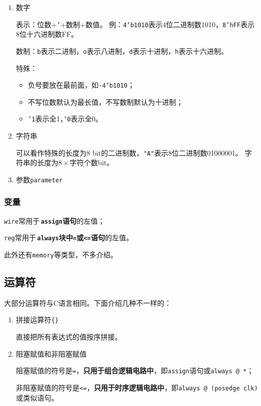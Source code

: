 \documentclass[UTF8,fontset=fandol,zihao=5]{ctexart}
\let\tt\texttt
\begin{document}
\begin{enumerate}
  \item 数字
  
  表示：位数+\tt{'}+数制+数值。
  例：\tt{4'b1010}表示4位二进制数1010，\tt{8'hFF}表示8位十六进制数FF。

  数制：\tt{b}表示二进制，\tt{o}表示八进制，\tt{d}表示十进制，\tt{h}表示十六进制。

  特殊：
  \begin{itemize}
    \item 负号要放在最前面，如\tt{-4'b1010}；
    \item 不写位数默认为最长值，不写数制默认为十进制；
    \item \tt{'1}表示全1，\tt{'0}表示全0。
  \end{itemize}
  
  \item 字符串
  
  可以看作特殊的长度为8 bit的二进制数，\tt{"A"}表示8位二进制数01000001。
  字符串的长度为$8\times\text{字符个数}$bit。

  \item 参数\tt{parameter}
\end{enumerate}

\subsubsection{变量}

  \tt{wire}常用于\,\textbf{\tt{assign}语句}的左值；
  
  \tt{reg}常用于\,\textbf{\tt{always}块中\tt{=}或\tt{<=}语句}的左值。

  此外还有\tt{memory}等类型，不多介绍。

\subsection{运算符}

大部分运算符与C语言相同。下面介绍几种不一样的：

\begin{enumerate}
  \item 拼接运算符\tt{\{\}}
  
  直接把所有表达式的值按序拼接。
  
  \item 阻塞赋值和非阻塞赋值
  
  阻塞赋值的符号是\tt{=}，\textbf{只用于组合逻辑电路中}，即\tt{assign}语句或\tt{always @ *}；
  
  非阻塞赋值的符号是\tt{<=}，\textbf{只用于时序逻辑电路中}，即\tt{always @ (posedge clk)}或类似语句。
\end{enumerate}
  
\end{document}
